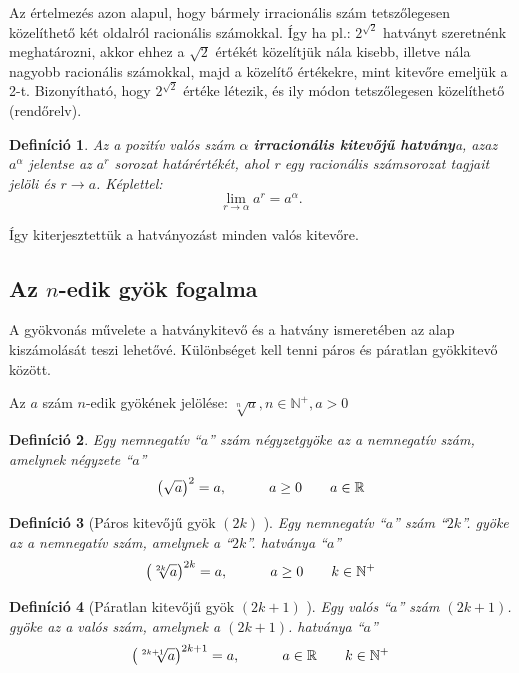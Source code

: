 \documentclass[12pt,a4paper]{article}
\newtheorem{definition}{Definíció} [section]
\begin{document}
Az értelmezés azon alapul, hogy bármely irracionális szám tetszőlegesen közelíthető két oldalról racionális számokkal. Így ha pl.: $2^{\sqrt{2}}$ hatványt szeretnénk meghatározni, akkor ehhez a $\sqrt{2}$ értékét közelítjük nála kisebb, illetve nála nagyobb racionális számokkal, majd a közelítő értékekre, mint kitevőre emeljük a 2-t. Bizonyítható, hogy $2^{\sqrt{2}}$ értéke létezik, és ily módon tetszőlegesen közelíthető (rendőrelv).

\begin{definition}
Az a pozitív valós szám $\alpha$ \textbf{irracionális kitevőjű hatvány}a, azaz $a^{\alpha}$ jelentse az $a^r$ sorozat határértékét, ahol r egy racionális számsorozat tagjait jelöli és $r \to a$. Képlettel:
\begin{equation}
\lim_{r\to \alpha}a^r=a^{\alpha}.
\end{equation}
\end{definition}

Így kiterjesztettük a hatványozást minden valós kitevőre.

\subsection{Az $n$-edik gyök fogalma}

A gyökvonás művelete a hatványkitevő és a hatvány ismeretében az alap kiszámolását teszi lehetővé. Különbséget kell tenni páros és páratlan gyökkitevő között.

Az $a$ szám $n$-edik gyökének jelölése: $\sqrt[n]{a}, n \in \mathbb{N}^+,a>0$

\begin{definition}
Egy nemnegatív ``$a$'' szám négyzetgyöke az a nemnegatív szám, amelynek négyzete ``$a$''
$$\left(\sqrt{a}\right)^2=a,\hspace{30px}a\geq 0\hspace{20px} a \in \mathbb{R}$$
\end{definition}

\begin{definition}[Páros kitevőjű gyök $(2k)$ ]
Egy nemnegatív ``$a$'' szám ``$2k$''. gyöke az a nemnegatív szám, amelynek a ``$2k$''. hatványa ``$a$''
$$\left(\sqrt[2k]{a}\right)^{2k}=a,\hspace{30px}a\geq 0 \hspace{20px} k\in \mathbb{N}^+$$
\end{definition}

\begin{definition}[Páratlan kitevőjű gyök $(2k+1)$ ]
Egy valós ``$a$'' szám $(2k+1)$. gyöke az a valós szám, amelynek a $(2k+1)$. hatványa ``$a$''
$$\left(\sqrt[2k+1]{a}\right)^{2k+1}=a,\hspace{30px}a\in \mathbb{R} \hspace{20px} k\in \mathbb{N}^+$$
\end{definition}
\end{document}
